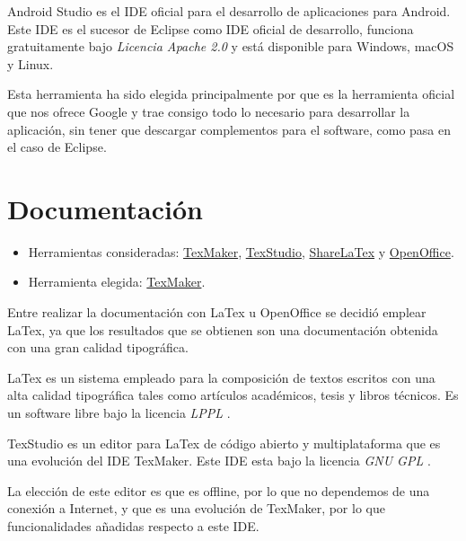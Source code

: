 Android Studio es el IDE oficial para el desarrollo de aplicaciones para Android. Este IDE es el sucesor de Eclipse como IDE oficial de desarrollo, funciona gratuitamente bajo \textit{Licencia Apache 2.0} y está disponible para Windows, macOS y Linux.

Esta herramienta ha sido elegida principalmente por que es la herramienta oficial que nos ofrece Google y trae consigo todo lo necesario para desarrollar la aplicación, sin tener que descargar complementos para el software, como pasa en el caso de Eclipse.

\section{Documentación}

\begin{itemize}
	\tightlist
	\item
	Herramientas consideradas: \href{http://www.xm1math.net/texmaker/}{TexMaker}, \href{https://www.texstudio.org/}{TexStudio}, \href{https://es.sharelatex.com/}{ShareLaTex} y \href{https://www.openoffice.org/es/}{OpenOffice}.
	\item
	Herramienta elegida: \href{http://www.xm1math.net/texmaker/}{TexMaker}.
\end{itemize}

Entre realizar la documentación con LaTex u OpenOffice se decidió emplear LaTex, ya que los resultados que se obtienen son una documentación obtenida con una gran calidad tipográfica.

LaTex es un sistema empleado para la composición de textos escritos con una alta calidad tipográfica tales como artículos académicos, tesis y libros técnicos. Es un software libre bajo la licencia \textit{LPPL} \cite{latex:wiki}.

TexStudio es un editor para LaTex de código abierto y multiplataforma que es una evolución del IDE TexMaker. Este IDE esta bajo la licencia \textit{GNU GPL} \cite{texstudio:wiki}.

La elección de este editor es que es offline, por lo que no dependemos de una conexión a Internet, y que es una evolución de TexMaker, por lo que funcionalidades añadidas respecto a este IDE.
